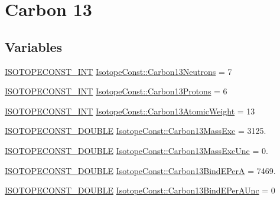 \hypertarget{group___isotope_const-_carbon-_c13}{}\section{Carbon 13}
\label{group___isotope_const-_carbon-_c13}
\subsection*{Variables}
\begin{DoxyCompactItemize}
\item 
\mbox{\hyperlink{group___isotope_const-_macros_ga5f18360b3e99483a35c32d789e62621c}{I\+S\+O\+T\+O\+P\+E\+C\+O\+N\+S\+T\+\_\+\+I\+NT}} \mbox{\hyperlink{group___isotope_const-_carbon-_c13_gace9c9fc991b8d64699dc4afa13952963}{Isotope\+Const\+::\+Carbon13\+Neutrons}} = 7
\item 
\mbox{\hyperlink{group___isotope_const-_macros_ga5f18360b3e99483a35c32d789e62621c}{I\+S\+O\+T\+O\+P\+E\+C\+O\+N\+S\+T\+\_\+\+I\+NT}} \mbox{\hyperlink{group___isotope_const-_carbon-_c13_gad76b37bb648ac804bf208c911e9a6ea3}{Isotope\+Const\+::\+Carbon13\+Protons}} = 6
\item 
\mbox{\hyperlink{group___isotope_const-_macros_ga5f18360b3e99483a35c32d789e62621c}{I\+S\+O\+T\+O\+P\+E\+C\+O\+N\+S\+T\+\_\+\+I\+NT}} \mbox{\hyperlink{group___isotope_const-_carbon-_c13_gac14d76d55767d91128913edcf63fb947}{Isotope\+Const\+::\+Carbon13\+Atomic\+Weight}} = 13
\item 
\mbox{\hyperlink{group___isotope_const-_macros_ga8f45a7272ce02c0b4c65c44636ed719a}{I\+S\+O\+T\+O\+P\+E\+C\+O\+N\+S\+T\+\_\+\+D\+O\+U\+B\+LE}} \mbox{\hyperlink{group___isotope_const-_carbon-_c13_gab17c5b1c7ca48df1079e25a8618f0a9a}{Isotope\+Const\+::\+Carbon13\+Mass\+Exc}} = 3125.
\item 
\mbox{\hyperlink{group___isotope_const-_macros_ga8f45a7272ce02c0b4c65c44636ed719a}{I\+S\+O\+T\+O\+P\+E\+C\+O\+N\+S\+T\+\_\+\+D\+O\+U\+B\+LE}} \mbox{\hyperlink{group___isotope_const-_carbon-_c13_gab33486f9665d4f3112d40d0a046b8cb5}{Isotope\+Const\+::\+Carbon13\+Mass\+Exc\+Unc}} = 0.
\item 
\mbox{\hyperlink{group___isotope_const-_macros_ga8f45a7272ce02c0b4c65c44636ed719a}{I\+S\+O\+T\+O\+P\+E\+C\+O\+N\+S\+T\+\_\+\+D\+O\+U\+B\+LE}} \mbox{\hyperlink{group___isotope_const-_carbon-_c13_gaf77808284501b17d7325ed89c210363d}{Isotope\+Const\+::\+Carbon13\+Bind\+E\+PerA}} = 7469.
\item 
\mbox{\hyperlink{group___isotope_const-_macros_ga8f45a7272ce02c0b4c65c44636ed719a}{I\+S\+O\+T\+O\+P\+E\+C\+O\+N\+S\+T\+\_\+\+D\+O\+U\+B\+LE}} \mbox{\hyperlink{group___isotope_const-_carbon-_c13_ga95d33cc96a0c48bdbf17601012fe45cb}{Isotope\+Const\+::\+Carbon13\+Bind\+E\+Per\+A\+Unc}} = 0

\end{DoxyCompactItemize}
